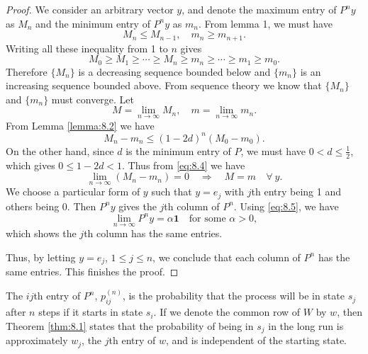 \begin{proof}
We consider an arbitrary vector $y$, and denote the maximum entry of $P^n y$ as $M_n$ and the minimum entry of $P^n y$ as $m_n$. From lemma 1, we must have 
\begin{equation*}
    M_n \leq M_{n-1}, \quad m_n \geq m_{n+1}.
\end{equation*}
Writing all these inequality from 1 to $n$ gives
\begin{equation*}
    M_0 \geq M_1 \geq \cdots \geq M_n \geq m_n \geq \cdots \geq m_1 \geq m_0.
\end{equation*}
Therefore $\{M_n\}$ is a decreasing sequence bounded below and $\{m_n\}$ is an increasing sequence bounded above. From sequence theory we know that $\{ M_n \}$ and $\{m_n\}$ must converge. Let
\begin{equation*}
    M = \lim_{n\to\infty} M_n, \quad m = \lim_{n\to\infty} m_n.
\end{equation*}
From Lemma \ref{lemma:8.2} we have 
\begin{equation}
    \label{eq:8.4}
    \tag{8-4}
    M_n - m_n \leq (1-2d)^n (M_0 - m_0).
\end{equation}
On the other hand, since $d$ is the minimum entry of $P$, we must have $0 < d \leq \frac{1}{2}$, which gives $0 \leq 1-2d < 1$. Thus from \eqref{eq:8.4} we have 
\begin{equation}
    \label{eq:8.5}
    \tag{8-5}
    \lim_{n\to\infty} (M_n - m_n) = 0 \quad \Rightarrow \quad 
    M=m \quad \forall \ y.
\end{equation}
We choose a particular form of $y$ such that $y = e_j$ with $j$th entry being 1 and others being 0. Then $P^n y$ gives the $j$th column of $P^n$. Using \eqref{eq:8.5}, we have
\begin{equation*}
    \lim_{n\to\infty} P^n y = \alpha \mathbf{1} \quad \text{for some $\alpha > 0$},
\end{equation*}
which shows the $j$th column has the same entries.

Thus, by letting $y = e_j$, $1\leq j \leq n$, we conclude that each column of $P^n$ has the same entries. This finishes the proof.
\end{proof}

The $ij$th entry of $P^n$, $p^{(n)}_{ij}$, is the probability that the process will be in state $s_j$ after $n$ steps if it starts in state $s_i$. If we denote the common row of $W$ by $w$, then Theorem \ref{thm:8.1} states that the probability of being in $s_j$ in the long run is approximately $w_j$, the $j$th entry of $w$, and is independent of the starting state. 

